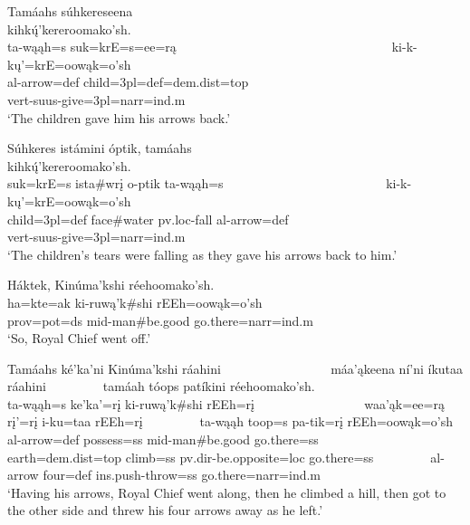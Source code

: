 \begin{exe}
\item\label{EJ59} \glll Tamáahs súhkereseena ~ ~ ~ ~ ~ ~ ~ ~ ~ ~ ~ ~ ~ ~ ~ ~ ~ ~ ~ ~ kihkų́'kereroomako'sh.\\
ta-wąąh=s suk=krE=s=ee=rą ~ ~ ~ ~ ~ ~ ~ ~ ~ ~ ~ ~ ~ ~ ~ ~ ~ ~ ~ ~ ki-k-kų'=krE=oowąk=o'sh\\
al-\textnormal{arrow}=def \textnormal{child}=3pl=def=dem.dist=top ~ ~ ~ ~ ~ ~ ~ ~ ~ ~ ~ ~ ~ ~ ~ ~ ~ ~ ~ ~ vert-suus-\textnormal{give}=3pl=narr=ind.m\\
\glt `The children gave him his arrows back.'

\item\label{EJ60} \glll Súhkeres istámini óptik, tamáahs ~ ~ ~ ~ ~ ~ ~ ~ ~ ~ ~ ~ ~ ~ ~ kihkų́'kereroomako'sh.\\
suk=krE=s ista\#wrį o-ptik ta-wąąh=s ~ ~ ~ ~ ~ ~ ~ ~ ~ ~ ~ ~ ~ ~ ~ ki-k-kų'=krE=oowąk=o'sh\\
\textnormal{child}=3pl=def \textnormal{face}\#\textnormal{water} pv.loc-\textnormal{fall} al-\textnormal{arrow}=def ~ ~ ~ ~ ~ ~ ~ ~ ~ ~ ~ ~ ~ ~ ~ vert-suus-\textnormal{give}=3pl=narr=ind.m\\
\glt `The children's tears were falling as they gave his arrows back to him.'

\item\label{EJ61} \glll Háktek, Kinúma'kshi réehoomako'sh.\\
ha=kte=ak ki-ruwą'k\#shi rEEh=oowąk=o'sh\\
prov=pot=ds mid-\textnormal{man}\#\textnormal{be.good} \textnormal{go.there}=narr=ind.m\\
\glt `So, Royal Chief went off.'

\item\label{EJ62} \glll Tamáahs ké'ka'ni Kinúma'kshi ráahini ~ ~ ~ ~ ~ ~ ~ ~ ~ ~ máa'ąkeena ní'ni íkutaa ráahini ~ ~ ~ ~ ~ tamáah tóops patíkini réehoomako'sh.\\
ta-wąąh=s ke'ka'=rį ki-ruwą'k\#shi rEEh=rį ~ ~ ~ ~ ~ ~ ~ ~ ~ ~ waa'ąk=ee=rą rį'=rį i-ku=taa rEEh=rį ~ ~ ~ ~ ~ ta-wąąh toop=s pa-tik=rį rEEh=oowąk=o'sh\\
al-\textnormal{arrow}=def \textnormal{possess}=ss mid-\textnormal{man}\#\textnormal{be.good} \textnormal{go.there}=ss ~ ~ ~ ~ ~ ~ ~ ~ ~ ~ \textnormal{earth}=dem.dist=top \textnormal{climb}=ss pv.dir-\textnormal{be.opposite}=loc \textnormal{go.there}=ss ~ ~ ~ ~ ~ al-\textnormal{arrow} \textnormal{four}=def ins.push-\textnormal{throw}=ss \textnormal{go.there}=narr=ind.m\\
\glt `Having his arrows, Royal Chief went along, then he climbed a hill, then got to the other side and threw his four arrows away as he left.'


\end{exe}
